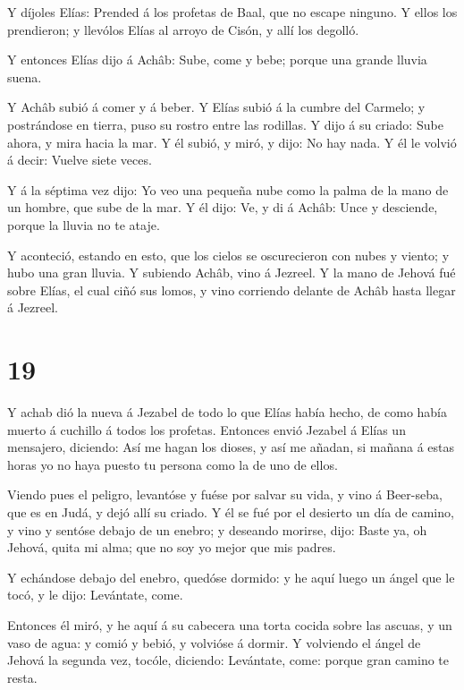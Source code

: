  Y díjoles Elías: Prended á los profetas de Baal, que no
escape ninguno. Y ellos los prendieron; y llevólos Elías al arroyo de
Cisón, y allí los degolló.

 Y entonces Elías dijo á Achâb: Sube, come y bebe; porque
una grande lluvia suena.

 Y Achâb subió á comer y á beber. Y Elías subió á la cumbre
del Carmelo; y postrándose en tierra, puso su rostro entre las rodillas.
 Y dijo á su criado: Sube ahora, y mira hacia la mar. Y él
subió, y miró, y dijo: No hay nada. Y él le volvió á decir: Vuelve siete
veces.

 Y á la séptima vez dijo: Yo veo una pequeña nube como la
palma de la mano de un hombre, que sube de la mar. Y él dijo: Ve, y di á
Achâb: Unce y desciende, porque la lluvia no te ataje.

 Y aconteció, estando en esto, que los cielos se
oscurecieron con nubes y viento; y hubo una gran lluvia. Y subiendo
Achâb, vino á Jezreel.  Y la mano de Jehová fué sobre
Elías, el cual ciñó sus lomos, y vino corriendo delante de Achâb hasta
llegar á Jezreel.

\hypertarget{section-18}{%
\section{19}\label{section-18}}

 Y achab dió la nueva á Jezabel de todo lo que Elías había
hecho, de como había muerto á cuchillo á todos los profetas.
 Entonces envió Jezabel á Elías un mensajero, diciendo: Así
me hagan los dioses, y así me añadan, si mañana á estas horas yo no haya
puesto tu persona como la de uno de ellos.

 Viendo pues el peligro, levantóse y fuése por salvar su
vida, y vino á Beer-seba, que es en Judá, y dejó allí su criado.
 Y él se fué por el desierto un día de camino, y vino y
sentóse debajo de un enebro; y deseando morirse, dijo: Baste ya, oh
Jehová, quita mi alma; que no soy yo mejor que mis padres.

 Y echándose debajo del enebro, quedóse dormido: y he aquí
luego un ángel que le tocó, y le dijo: Levántate, come.

 Entonces él miró, y he aquí á su cabecera una torta cocida
sobre las ascuas, y un vaso de agua: y comió y bebió, y volvióse á
dormir.  Y volviendo el ángel de Jehová la segunda vez,
tocóle, diciendo: Levántate, come: porque gran camino te resta.

